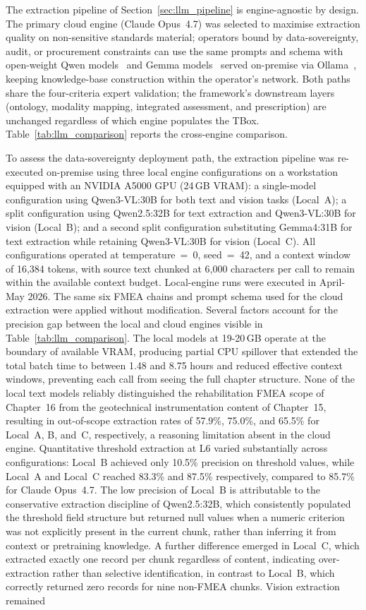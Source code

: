 \documentclass[11pt,a4paper]{article}
\begin{document}
The extraction pipeline of Section~\ref{sec:llm_pipeline} is engine-agnostic by design. The primary cloud engine (Claude Opus~4.7) was selected to maximise extraction quality on non-sensitive standards material; operators bound by data-sovereignty, audit, or procurement constraints can use the same prompts and schema with open-weight Qwen models~\citep{Qwen2024} and Gemma models~\citep{gemma4_2026} served on-premise via Ollama~\citep{Ollama2024}, keeping knowledge-base construction within the operator's network. Both paths share the four-criteria expert validation; the framework's downstream layers (ontology, modality mapping, integrated assessment, and prescription) are unchanged regardless of which engine populates the TBox. Table~\ref{tab:llm_comparison} reports the cross-engine comparison.

To assess the data-sovereignty deployment path, the extraction pipeline was re-executed on-premise using three local engine configurations on a workstation equipped with an NVIDIA A5000 GPU (24\,GB VRAM): a single-model configuration using Qwen3-VL:30B for both text and vision tasks (Local~A); a split configuration using Qwen2.5:32B for text extraction and Qwen3-VL:30B for vision (Local~B); and a second split configuration substituting Gemma4:31B for text extraction while retaining Qwen3-VL:30B for vision (Local~C). All configurations operated at temperature~=~0, seed~=~42, and a context window of 16,384 tokens, with source text chunked at 6,000 characters per call to remain within the available context budget. Local-engine runs were executed in April-May 2026. The same six FMEA chains and prompt schema used for the cloud extraction were applied without modification. Several factors account for the precision gap between the local and cloud engines visible in Table~\ref{tab:llm_comparison}. The local models at 19-20\,GB operate at the boundary of available VRAM, producing partial CPU spillover that extended the total batch time to between 1.48 and 8.75 hours and reduced effective context windows, preventing each call from seeing the full chapter structure. None of the local text models reliably distinguished the rehabilitation FMEA scope of Chapter~16 from the geotechnical instrumentation content of Chapter~15, resulting in out-of-scope extraction rates of 57.9\%, 75.0\%, and 65.5\% for Local~A, B, and~C, respectively, a reasoning limitation absent in the cloud engine. Quantitative threshold extraction at L6 varied substantially across configurations: Local~B achieved only 10.5\% precision on threshold values, while Local~A and Local~C reached 83.3\% and 87.5\% respectively, compared to 85.7\% for Claude Opus~4.7. The low precision of Local~B is attributable to the conservative extraction discipline of Qwen2.5:32B, which consistently populated the threshold field structure but returned null values when a numeric criterion was not explicitly present in the current chunk, rather than inferring it from context or pretraining knowledge.  A further difference emerged in Local~C, which extracted exactly one record per chunk regardless of content, indicating over-extraction rather than selective identification, in contrast to Local~B, which correctly returned zero records for nine non-FMEA chunks. Vision extraction remained 
\end{document}

